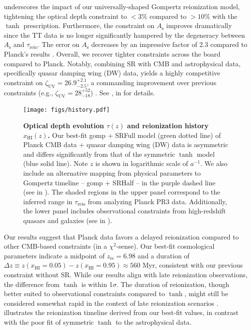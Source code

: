 \documentclass[12pt, a4paper]{article}
\newcommand{\As}{A_\mathrm{s}}
\newcommand{\zetaUV}{\zeta_\mathrm{UV}}
\newcommand{\HI}{\mathrm{HI}}
\newcommand{\re}{\mathrm{re}}
\newcommand{\reio}{\mathrm{reio}}
\begin{document}
 underscores the impact of our universally-shaped
Gompertz reionization model, tightening the optical depth constraint to
$<3\%$ compared to $> 10\%$ with the $\tanh$ prescription.
Furthermore, the constraint on $\As$ improves dramatically since the TT
data is no longer significantly hampered by the degeneracy between $\As$
and $\tau_\reio$.
The error on $\As$ decreases by an impressive factor of 2.3 compared to
Planck's results \cite{Planck2020a}.
Overall, we recover tighter constraints across the board compared to
Planck.
Notably, combining SR with CMB and astrophysical data, specifically
quasar damping wing (DW) data, yields a highly competitive constraint on
$\zetaUV = 26.9^{+2.1}_{-2.5}$, a commanding improvement over previous
constraints (e.g., $\zetaUV = 28^{+52}_{-18}$) \cite{Greig2017}.
See ,  in
 for details.

\begin{figure}[tb]
\centering
\texttt{[image: figs/history.pdf]}
\caption{\textbf{\boldmath Optical depth evolution $\tau(z)$ and
reionization history $x_\HI(z)$.}
Our best-fit gomp + SRFull model (green dotted line) of Planck CMB data
+ quasar damping wing (DW) data is asymmetric and differs significantly
from that of the symmetric $\tanh$ model (blue solid line).
Note $z$ is shown in logarithmic scale of $a^{-1}$.
We also include an alternative mapping from physical parameters to
Gompertz timeline -- gomp + SRHalf -- in the purple dashed line (see
 in ).
The shaded regions in the upper panel correspond to the inferred range
in $\tau_\reio$ from analyzing Planck PR3 data.
Additionally, the lower panel includes observational constraints from
high-redshift quasars and galaxies (see  in
).}
\label{fig:history} \end{figure}

Our results suggest that Planck data favors a delayed reionization
compared to other CMB-based constraints (in a $\chi^2$-sense).
Our best-fit cosmological parameters indicate a midpoint of $z_\re =
6.98$ and a duration of $\Delta z \equiv z(x_\HI = 0.05) - z(x_\HI =
0.95) \approx 560 $ Myr, consistent with our previous constraint
without SR.
While our results align with late reionization observations, the
difference from $\tanh$ is within 1$\sigma$.
The duration of reionization, though better suited to observational
constraints compared to $\tanh$, might still be considered somewhat
rapid in the context of late reionization scenarios \cite{Cain2021}.
 illustrates the reionization timeline derived from
our best-fit values, in contrast with the poor fit of symmetric $\tanh$
to the astrophysical data.
\end{document}
